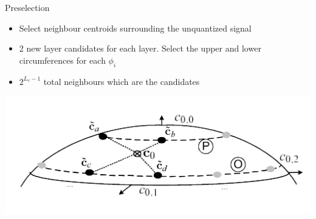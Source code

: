 \documentclass[10pt]{beamer}
\begin{document}
\begin{frame}{Preselection}
  \begin{itemize}
    \item Select neighbour centroids surrounding the unquantized signal
    \item  2 new layer candidates for each layer. Select the upper and lower circumferences for each $\phi_i$
    \item $2^{L_v -1}$ total neighbours which are the candidates
  \end{itemize}
  \centering
  \includegraphics[width=\linewidth]{./img/optim_search_2.png}
\end{frame}
\end{document}
